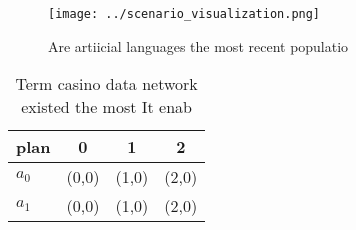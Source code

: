 \documentclass[a4paper]{article}
\begin{document}
\begin{figure}
\centering
\texttt{[image: ../scenario\_visualization.png]}
\caption{Are artiicial languages the most recent populatio
}
\end{figure}
 
\begin{table}
\begin{adjustbox}{width=0.5\columnwidth}
\begin{tabular}{|l|l|l|l|}
\hline
\textbf{plan} & \multicolumn{1}{c|}{\textbf{0}} & \multicolumn{1}{c|}{\textbf{1}} & \multicolumn{1}{c|}{\textbf{2}} \\ \hline
\textbf{$a_0$}  & (0,0) & (1,0) & (2,0) \\ \hline
\textbf{$a_1$}  & (0,0) & (1,0) & (2,0) \\ \hline
\end{tabular}
\end{adjustbox}
\caption{Term casino data network existed the most It enab
}
\end{table}
\end{document}
